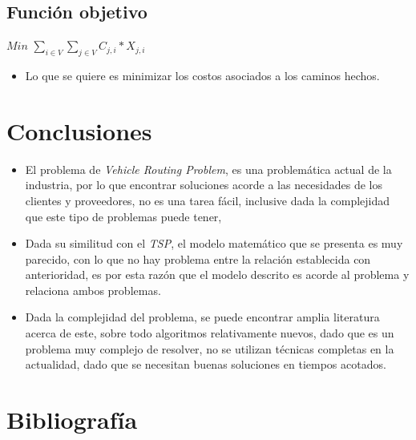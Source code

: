 \documentclass[letter, 10pt]{article}
\begin{document}
\subsection{Funci\'on objetivo}

\begin{center}
$Min$ $\displaystyle\sum_{i \in V}\sum_{j \in V} C_{j,i}*X_{j,i}$
\end{center}
\begin{itemize}
 \item Lo que se quiere es minimizar los costos asociados a los caminos hechos.
\end{itemize}


\section{Conclusiones}
\begin{itemize}
 \item El problema de \emph{Vehicle Routing Problem}, es una problem\'atica actual de la industria, por lo que encontrar soluciones acorde 
 a las necesidades de los clientes y proveedores, no es una tarea f\'acil, inclusive dada la complejidad que este tipo de problemas puede tener,
 \item Dada su similitud con el \emph{TSP}, el modelo matem\'atico que se presenta es muy parecido, con lo que no hay problema entre la 
 relaci\'on establecida con anterioridad, es por esta raz\'on que el modelo descrito es acorde al problema y relaciona ambos problemas.
 \item Dada la complejidad del problema, se puede encontrar amplia literatura acerca de este, sobre todo algoritmos relativamente nuevos, dado que
 es un problema muy complejo de resolver, no se utilizan t\'ecnicas completas en la actualidad, dado que se necesitan buenas soluciones en tiempos 
 acotados.
 \end{itemize}


\section{Bibliograf\'ia}


\end{document}
